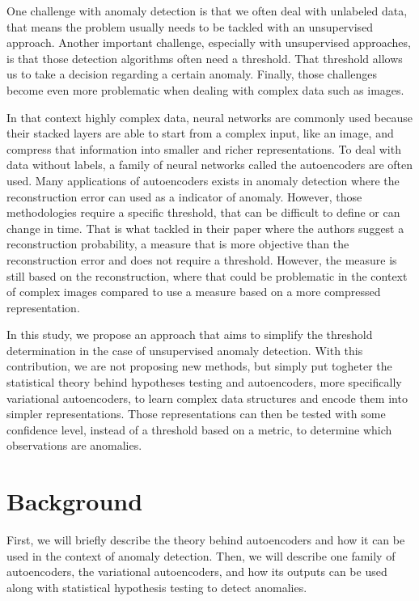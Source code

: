 \documentclass{article}
\begin{document}
One challenge with anomaly detection is that we often deal with unlabeled data, that means the problem usually needs to be tackled with an unsupervised approach. Another important challenge, especially with unsupervised approaches, is that those detection algorithms often need a threshold. That threshold allows us to take a decision regarding a certain anomaly. Finally, those challenges become even more problematic when dealing with complex data such as images. \newline

In that context highly complex data, neural networks are commonly used because their stacked layers are able to start from a complex input, like an image, and compress that information into smaller and richer representations. To deal with data without labels, a family of neural networks called the autoencoders are often used. Many applications of autoencoders exists in anomaly detection where the reconstruction error can used as a indicator of anomaly. However, those methodologies require a specific threshold, that can be difficult to define or can change in time. That is what \cite{An2015VariationalAB} tackled in their paper where the authors suggest a reconstruction probability, a measure that is more objective than the reconstruction error and does not require a threshold. However, the measure is still based on the reconstruction, where that could be problematic in the context of complex images compared to use a measure based on a more compressed representation.
\newline


In this study, we propose an approach that aims to simplify the threshold determination in the case of unsupervised anomaly detection. With this contribution, we are not proposing new methods, but simply put togheter the statistical theory behind hypotheses testing and autoencoders, more specifically variational autoencoders, to learn complex data structures and encode them into simpler representations. Those representations can then be tested with some confidence level, instead of a threshold based on a metric, to determine which observations are anomalies.

\section{Background} \label{background}

First, we will briefly describe the theory behind autoencoders and how it can be used in the context of anomaly detection. Then, we will describe one family of autoencoders, the variational autoencoders, and how its outputs can be used along with statistical hypothesis testing to detect anomalies.
\end{document}
